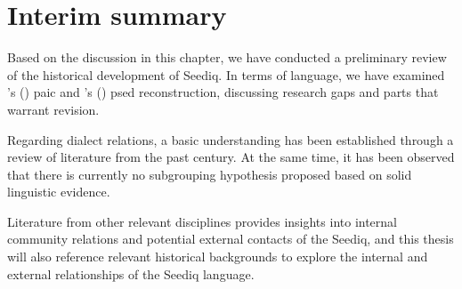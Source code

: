 \section{Interim summary} \label{sec:ch2_sum}

Based on the discussion in this chapter, we have conducted a preliminary review of the historical development of Seediq. In terms of language, we have examined \citeauthor{li1981paic}'s (\citeyear{li1981paic}) \acl{paic} and \citeauthor{ochiai2016buhwan}'s (\citeyear{ochiai2016buhwan}) \acl{psed} reconstruction, discussing research gaps and parts that warrant revision. 

Regarding dialect relations, a basic understanding has been established through a review of literature from the past century. At the same time, it has been observed that there is currently no subgrouping hypothesis proposed based on solid linguistic evidence.

Literature from other relevant disciplines provides insights into internal community relations and potential external contacts of the Seediq, and this thesis will also reference relevant historical backgrounds to explore the internal and external relationships of the Seediq language.
